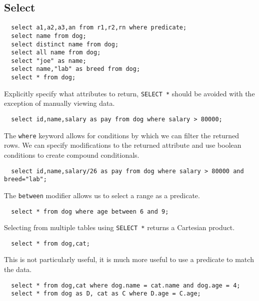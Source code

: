 \documentclass{math}
\begin{document}
\subsection*{Select}
\begin{lstlisting}
  select a1,a2,a3,an from r1,r2,rn where predicate;
  select name from dog;
  select distinct name from dog;
  select all name from dog;
  select "joe" as name;
  select name,"lab" as breed from dog;
  select * from dog;
\end{lstlisting}
Explicitly specify what attributes to return, \texttt{SELECT *} should be
avoided with the exception of manually viewing data.
\begin{lstlisting}
  select id,name,salary as pay from dog where salary > 80000;
\end{lstlisting}
The \texttt{where} keyword allows for conditions by which we can filter the
returned rows. We can specify modifications to the returned attribute and use
boolean conditions to create compound conditionals.
\begin{lstlisting}
  select id,name,salary/26 as pay from dog where salary > 80000 and breed="lab";
\end{lstlisting}
The \texttt{between} modifier allows us to select a range as a predicate.
\begin{lstlisting}
  select * from dog where age between 6 and 9;
\end{lstlisting}
Selecting from multiple tables using \texttt{SELECT *} returns a Cartesian
product.
\begin{lstlisting}
  select * from dog,cat;
\end{lstlisting}
This is not particularly useful, it is much more useful to use a predicate to
match the data.
\begin{lstlisting}
  select * from dog,cat where dog.name = cat.name and dog.age = 4;
  select * from dog as D, cat as C where D.age = C.age;
\end{lstlisting}
\end{document}
